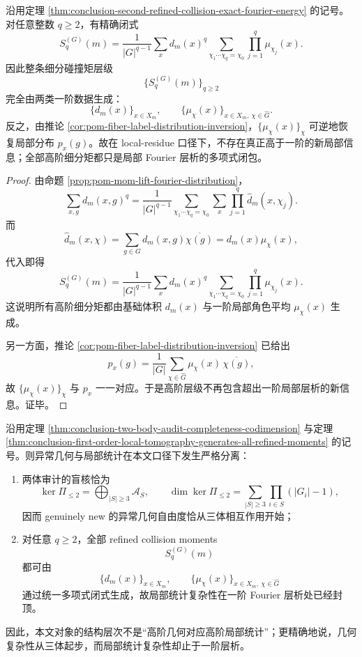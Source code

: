 \begin{theorem}[一阶局部层析生成全部高阶细分矩]\label{thm:conclusion-first-order-local-tomography-generates-all-refined-moments}
沿用定理 \ref{thm:conclusion-second-refined-collision-exact-fourier-energy} 的记号。对任意整数 \(q\ge2\)，有精确闭式
\[
S_q^{(G)}(m)
=
\frac1{|G|^{q-1}}
\sum_{x}d_m(x)^q
\sum_{\chi_1\cdots\chi_q=\chi_0}
\prod_{j=1}^{q}\mu_{\chi_j}(x).
\]
因此整条细分碰撞矩层级
\[
\{S_q^{(G)}(m)\}_{q\ge2}
\]
完全由两类一阶数据生成：
\[
\{d_m(x)\}_{x\in X_m},
\qquad
\{\mu_\chi(x)\}_{x\in X_m,\ \chi\in\widehat G}.
\]
反之，由推论 \ref{cor:pom-fiber-label-distribution-inversion}，\(\{\mu_\chi(x)\}_{\chi}\) 可逆地恢复局部分布 \(p_x(g)\)。故在 local-residue 口径下，不存在真正高于一阶的新局部信息；全部高阶细分矩都只是局部 Fourier 层析的多项式闭包。
\end{theorem}
\begin{proof}
由命题 \ref{prop:pom-mom-lift-fourier-distribution}，
\[
\sum_{x,g}d_m(x,g)^q
=
\frac{1}{|G|^{q-1}}
\sum_{\chi_1\cdots\chi_q=\chi_0}
\sum_x \prod_{j=1}^{q}\widehat d_m(x,\chi_j).
\]
而
\[
\widehat d_m(x,\chi)=\sum_{g\in G}d_m(x,g)\overline{\chi(g)}
=
d_m(x)\mu_\chi(x),
\]
代入即得
\[
S_q^{(G)}(m)
=
\frac1{|G|^{q-1}}
\sum_x d_m(x)^q
\sum_{\chi_1\cdots\chi_q=\chi_0}
\prod_{j=1}^{q}\mu_{\chi_j}(x).
\]
这说明所有高阶细分矩都由基础体积 \(d_m(x)\) 与一阶局部角色平均 \(\mu_\chi(x)\) 生成。

另一方面，推论 \ref{cor:pom-fiber-label-distribution-inversion} 已给出
\[
p_x(g)=\frac1{|G|}\sum_{\chi\in\widehat G}\mu_\chi(x)\,\overline{\chi(g)},
\]
故 \(\{\mu_\chi(x)\}_\chi\) 与 \(p_x\) 一一对应。于是高阶层级不再包含超出一阶局部层析的新信息。证毕。
\end{proof}

\begin{theorem}[三体起源与一阶局部层析封顶]\label{thm:conclusion-threebody-origin-firstorder-local-ceiling}
沿用定理 \ref{thm:conclusion-two-body-audit-completeness-codimension} 与定理 \ref{thm:conclusion-first-order-local-tomography-generates-all-refined-moments} 的记号。则异常几何与局部统计在本文口径下发生严格分离：
\begin{enumerate}
  \item 两体审计的盲核恰为
  \[
  \ker \Pi_{\le2}=\bigoplus_{|S|\ge3}\mathcal A_S,
  \qquad
  \dim \ker \Pi_{\le2}
  =
  \sum_{|S|\ge3}\prod_{i\in S}(|G_i|-1),
  \]
  因而 genuinely new 的异常几何自由度恰从三体相互作用开始；
  \item 对任意 \(q\ge2\)，全部 refined collision moments
  \[
  S_q^{(G)}(m)
  \]
  都可由
  \[
  \{d_m(x)\}_{x\in X_m},
  \qquad
  \{\mu_\chi(x)\}_{x\in X_m,\ \chi\in\widehat G}
  \]
  通过统一多项式闭式生成，故局部统计复杂性在一阶 Fourier 层析处已经封顶。
\end{enumerate}
因此，本文对象的结构层次不是“高阶几何对应高阶局部统计”；更精确地说，几何复杂性从三体起步，而局部统计复杂性却止于一阶层析。
\end{theorem}

